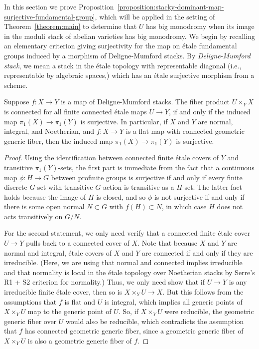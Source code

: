In this section we prove Proposition~\ref{proposition:stacky-dominant-map-surjective-fundamental-group}, which will be applied
in the setting of Theorem~\ref{theorem:main} to determine
that $U$ has big monodromy when its image in the moduli stack of
abelian varieties has big monodromy. We begin by recalling an elementary criterion giving surjectivity for the map on \'{e}tale fundamental groups induced by a morphism of Deligne-Mumford stacks. By {\em Deligne-Mumford stack}, we mean a stack in the \'etale topology with representable diagonal (i.e., representable by algebraic spaces,)
which has an \'etale surjective morphism from a scheme.
\begin{lemma}
       \label{lemma:surjectivity-criterion-pi1}
       Suppose $f\colon X \rightarrow Y$ is a map of Deligne-Mumford stacks.
       The fiber product $U \times_Y X$ is connected
       for all finite connected \'etale maps $U \rightarrow Y$,
       if and only if
       the induced map $\pi_1(X) \rightarrow \pi_1(Y)$ is surjective.
       In particular, if $X$ and $Y$ are normal, integral, and Noetherian, and $f: X \rightarrow Y$ is a flat map with connected geometric
       generic fiber, then the induced map $\pi_1(X) \rightarrow \pi_1(Y)$ is surjective.
\end{lemma}
\begin{proof}
Using the identification between connected finite \'etale covers of $Y$ and transitive $\pi_1(Y)$-sets, the first part is immediate from the fact that a continuous map $\phi \colon H \rightarrow G$ between profinite groups is surjective if and only if every finite discrete $G$-set with transitive $G$-action is transitive as a $H$-set.
The latter fact holds because the image of $H$ is closed, and so $\phi$ is not surjective if and only if there is some open normal
$N \subset G$ with $f(H) \subset N$, in which case $H$ does not acts transitively on $G/N$.

For the second statement,
we only need verify that a connected finite \'etale cover $U \rightarrow Y$ pulls back to a connected cover of $X$.
Note that because $X$ and $Y$ are normal and integral, \'etale covers of $X$ and $Y$ are connected if and only if they are irreducible. (Here, we are using that
normal and connected implies irreducible and that
normality is local in the \'etale topology over Noetherian stacks by Serre's R1 + S2 criterion for normality.)
Thus, we only need show that if $U \rightarrow Y$ is any irreducible finite \'etale cover, then so is $X \times_Y U \rightarrow X$.
But this follows from the assumptions that $f$ is flat and $U$ is integral,
which implies all generic points of $X \times_Y U$ map to the generic point of $U$.
So, if $X \times_Y U$ were reducible, the geometric generic fiber over $U$ would also be
reducible, which contradicts the assumption that $f$ has connected geometric generic fiber, since a geometric generic fiber of
$X \times_Y U$ is also a geometric generic fiber of $f$.
\end{proof}

